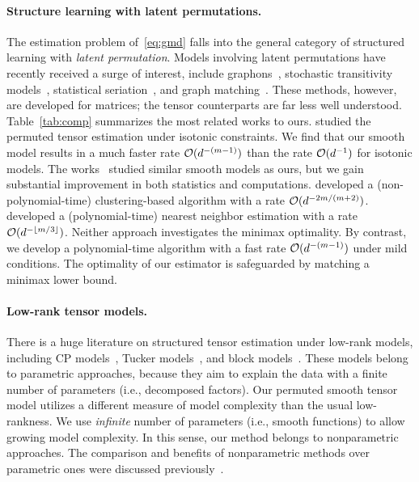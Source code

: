 \documentclass[11pt]{article}
\theoremstyle{definition}
\begin{document}
\paragraph{Structure learning with latent permutations.} The estimation problem of~\eqref{eq:gmd} falls into the general category of structured learning with \emph{latent permutation}. Models involving latent permutations have recently received a surge of interest, include graphons~\citep{chan2014consistent,klopp2017oracle}, stochastic transitivity models~\citep{chatterjee2015matrix,shah2019low}, statistical seriation~\citep{flammarion2019optimal,hutter2020estimation}, and graph matching~\citep{ding2021efficient,livi2013graph}. These methods, however, are developed for matrices; the tensor counterparts are far less well understood. Table~\ref{tab:comp} summarizes the most related works to ours. \citet{pananjady2020isotonic} studied the permuted tensor estimation under isotonic constraints.  We find that our smooth model results in a much faster rate $\mathcal{O}(d^{-(m-1)})$ than the rate $\mathcal{O}(d^{-1})$ for isotonic models. The works~\citep{balasubramanian2021nonparametric,li2019nearest} studied similar smooth models as ours, but we gain substantial improvement in both statistics and computations. \citet{balasubramanian2021nonparametric} developed a (non-polynomial-time) clustering-based algorithm with a rate $\mathcal{O}(d^{-2m/(m+2)})$. \citet{li2019nearest} developed a (polynomial-time) nearest neighbor estimation with a rate $\mathcal{O}(d^{-\lfloor m/3\rfloor})$. Neither approach investigates the minimax optimality. By contrast, we develop a polynomial-time algorithm with a fast rate $\mathcal{O}(d^{-(m-1)})$ under mild conditions. The optimality of our estimator is safeguarded by matching a minimax lower bound. 


\paragraph{Low-rank tensor models.} There is a huge literature on structured tensor estimation under low-rank models, including CP models~\citep{kolda2009tensor,sun2017provable}, Tucker models~\citep{zhang2018tensor}, and block models~\citep{wang2019multiway}. These models belong to parametric approaches, because they aim to explain the data with a finite number of parameters (i.e., decomposed factors). Our permuted smooth tensor model utilizes a different measure of model complexity than the usual low-rankness. We use \emph{infinite} number of parameters (i.e., smooth functions) to allow growing model complexity. In this sense, our method belongs to nonparametric approaches. The comparison and benefits of nonparametric methods over parametric ones were discussed previously~\citep{pananjady2020isotonic,li2019nearest,gao2015rate,bickel2009nonparametric,shah2019low}.  
 
\end{document}

